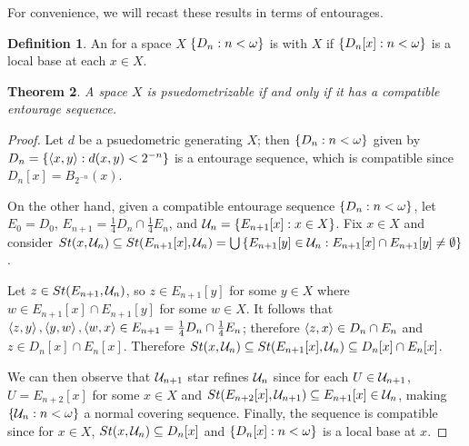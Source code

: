 \documentclass{amsart}
\newtheorem{theorem}{Theorem}[section]
\theoremstyle{definition}
\newtheorem{definition}[theorem]{Definition}
\begin{document}
For convenience, we will recast these results in terms of entourages.

\begin{definition}
An  for a space \(X\) 
\(\left\{D_n:n<\omega\right\}\) 
is  with \(X\) if \(\left\{D_n[x]:n<\omega\right\}\)
is a local base at each \(x\in X\).
\end{definition}
\begin{theorem}
A space \(X\) is psuedometrizable if and only if it has a compatible
entourage sequence.
\end{theorem}
\begin{proof}
Let \(d\) be a psuedometric generating \(X\); then \(\left\{D_n:n<\omega\right\}\)
given by \(D_n=\left\{\left\langle x,y\right\rangle:d(x,y)<2^{-n}\right\}\) is a entourage sequence,
which is compatible since \(D_n[x]=B_{2^{-n}}(x)\). 

On the other hand, given a compatible entourage sequence \(\left\{D_n:n<\omega\right\}\),
let \(E_0=D_0\), \(E_{n+1}=\frac{1}{4}D_n\cap \frac{1}{4}E_n\), and
\(\mathcal{U}_n=\left\{E_{n+1}[x]:x\in X\right\}\). Fix \(x\in X\) and consider
\(St(x,\mathcal{U}_n)\subseteq St(E_{n+1}[x],\mathcal{U}_n)=
\bigcup\left\{E_{n+1}[y]\in\mathcal{U}_n:E_{n+1}[x]\cap E_{n+1}[y]\not=\emptyset\right\}\).

Let \(z\in St(E_{n+1},\mathcal{U}_n)\), so \(z\in E_{n+1}[y]\) for some \(y\in X\)
where \(w\in E_{n+1}[x]\cap E_{n+1}[y]\) for some \(w\in X\).
It follows that \(\left\langle z,y\right\rangle,\left\langle y,w\right\rangle,\left\langle w,x\right\rangle\in E_{n+1}
=\frac{1}{4}D_{n}\cap\frac{1}{4}E_n\); therefore 
\(\left\langle z,x\right\rangle\in D_{n}\cap E_n\) and \(z\in D_{n}[x]\cap E_n[x]\).
Therefore
\(St(x,\mathcal{U}_n)\subseteq St(E_{n+1}[x],\mathcal{U}_n)\subseteq D_{n}[x]\cap E_n[x]\).

We can then observe that \(\mathcal{U}_{n+1}\) star refines \(\mathcal{U}_{n}\)
since for each \(U\in\mathcal{U}_{n+1}\), \(U=E_{n+2}[x]\) for some \(x\in X\)
and \(St(E_{n+2}[x],\mathcal{U}_{n+1})\subseteq E_{n+1}[x]\in\mathcal{U}_n\),
making \(\left\{\mathcal{U}_n:n<\omega\right\}\) a normal covering sequence.
Finally, the sequence is compatible since for \(x\in X\),
\(St(x,\mathcal{U}_n)\subseteq D_{n}[x]\) and \(\left\{D_{n}[x]:n<\omega\right\}\)
is a local base at \(x\). 
\end{proof}
\end{document}
